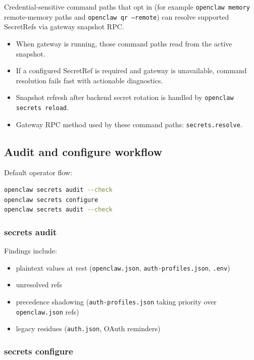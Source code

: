 Credential-sensitive command paths that opt in (for example \texttt{openclaw memory} remote-memory paths and \texttt{openclaw qr --remote}) can resolve supported SecretRefs via gateway snapshot RPC.

\begin{itemize}
  \item When gateway is running, those command paths read from the active snapshot.
  \item If a configured SecretRef is required and gateway is unavailable, command resolution fails fast with actionable diagnostics.
  \item Snapshot refresh after backend secret rotation is handled by \texttt{openclaw secrets reload}.
  \item Gateway RPC method used by these command paths: \texttt{secrets.resolve}.
\end{itemize}


\subsection{Audit and configure workflow}


Default operator flow:

\begin{lstlisting}[language=bash]
openclaw secrets audit --check
openclaw secrets configure
openclaw secrets audit --check
\end{lstlisting}


\subsubsection{secrets audit}


Findings include:

\begin{itemize}
  \item plaintext values at rest (\texttt{openclaw.json}, \texttt{auth-profiles.json}, \texttt{.env})
  \item unresolved refs
  \item precedence shadowing (\texttt{auth-profiles.json} taking priority over \texttt{openclaw.json} refs)
  \item legacy residues (\texttt{auth.json}, OAuth reminders)
\end{itemize}


\subsubsection{secrets configure}


